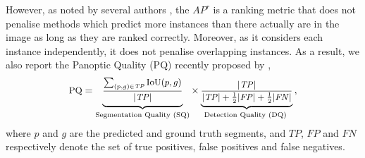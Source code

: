 \documentclass[runningheads]{llncs}
\begin{document}
However, as noted by several authors \cite{yang_2012,arnab_cvpr_2017,bai_cvpr_2017,kirillov_arxiv_2018}, the $AP^r$ is a ranking metric that does not penalise methods which predict more instances than there actually are in the image as long as they are ranked correctly.
Moreover, as it considers each instance independently, it does not penalise overlapping instances.
As a result, we also report the Panoptic Quality (PQ) recently proposed by \cite{kirillov_arxiv_2018},
\newcommand{\TP}{\mathit{TP}}
\newcommand{\FN}{\mathit{FN}}
\newcommand{\FP}{\mathit{FP}}
\newcommand{\IoU}{\text{IoU}}
\begin{equation}
\small{\text{PQ}} = \underbrace{\frac{\sum_{(p, g) \in \TP} \text{IoU}(p, g)}{\vphantom{\frac{1}{2}}|\TP|}}_{\text{Segmentation Quality (SQ)}} \times \underbrace{\frac{|\TP|}{|\TP| + \frac{1}{2} |\FP| + \frac{1}{2} |\FN|}}_{\text{Detection Quality (DQ) }} \,,
\end{equation}
where $p$ and $g$ are the predicted and ground truth segments, and $\TP$, $\FP$ and $\FN$ respectively denote the set of true positives, false positives and false negatives.
\end{document}
